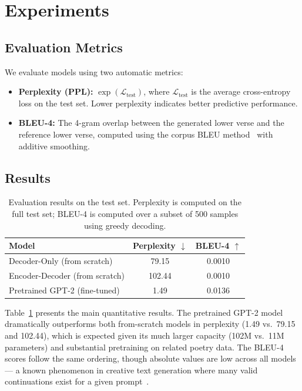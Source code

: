 \documentclass[11pt,a4paper]{article}
\begin{document}
\section{Experiments}
\label{sec:experiments}

\subsection{Evaluation Metrics}

We evaluate models using two automatic metrics:
\begin{itemize}[nosep]
    \item \textbf{Perplexity (PPL):}
          \(\exp(\mathcal{L}_{\text{test}})\), where
          \(\mathcal{L}_{\text{test}}\) is the average cross-entropy loss on
          the test set.
          Lower perplexity indicates better predictive performance.
    \item \textbf{BLEU-4:}
          The 4-gram overlap between the generated lower verse and the
          reference lower verse, computed using the corpus BLEU
          method~\cite{papineni2002bleu} with additive smoothing.
\end{itemize}

\subsection{Results}

\begin{table}[H]
\centering
\small
\renewcommand{\arraystretch}{1.1}
\caption{Evaluation results on the test set.
         Perplexity is computed on the full test set; BLEU-4 is computed
         over a subset of 500 samples using greedy decoding.}
\label{tab:results}
\begin{tabular}{lcc}
\toprule
\textbf{Model}                          & \textbf{Perplexity \(\downarrow\)} & \textbf{BLEU-4 \(\uparrow\)} \\
\midrule
Decoder-Only (from scratch)             & 79.15   & 0.0010 \\
Encoder-Decoder (from scratch)          & 102.44  & 0.0010 \\
Pretrained GPT-2 (fine-tuned)           & 1.49    & 0.0136 \\
\bottomrule
\end{tabular}
\end{table}

Table~\ref{tab:results} presents the main quantitative results.
The pretrained GPT-2 model dramatically outperforms both from-scratch models
in perplexity (1.49 vs.~79.15 and 102.44), which is expected given its much
larger capacity (102M vs.~11M parameters) and substantial pretraining on
related poetry data.
The BLEU-4 scores follow the same ordering, though absolute values are low
across all models --- a known phenomenon in creative text generation where
many valid continuations exist for a given
prompt~\cite{novikova2017why}.
\end{document}
